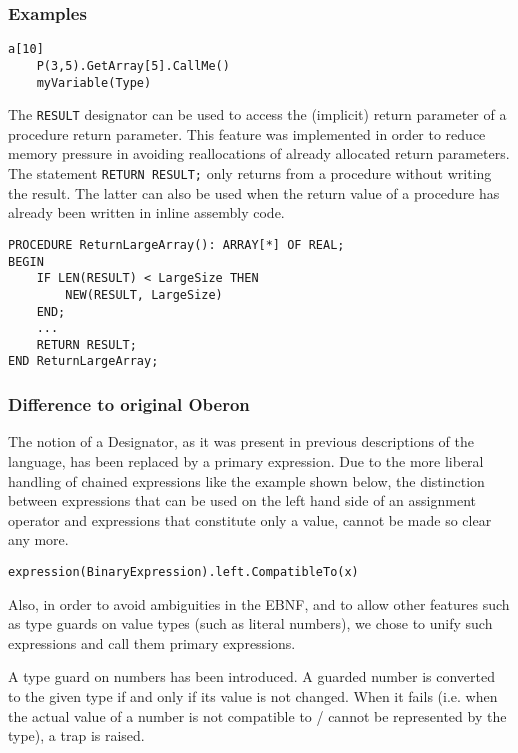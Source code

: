 \documentclass[a4wide,11pt]{article}
\begin{document}
\begin{annotation}
\subsubsection{Examples}
\begin{lstlisting}[style=example,caption=Example of Designators]
	a[10]
	P(3,5).GetArray[5].CallMe()
	myVariable(Type)
\end{lstlisting}

The \lstinline"RESULT" designator can be used to access the (implicit) return parameter of a procedure return parameter.
This feature was implemented in order to reduce memory pressure in avoiding reallocations of already allocated return parameters.
The statement \lstinline"RETURN RESULT;" only returns from a procedure without writing the result.
The latter can also be used when the return value of a procedure has already been written in inline assembly code.
\begin{lstlisting}[style=example]
PROCEDURE ReturnLargeArray(): ARRAY[*] OF REAL;
BEGIN
	IF LEN(RESULT) < LargeSize THEN
		NEW(RESULT, LargeSize)
	END;
	...
	RETURN RESULT;
END ReturnLargeArray;
\end{lstlisting}

\subsubsection{Difference to original Oberon}
The notion of a Designator, as it was present in previous descriptions of the language, has been replaced by a primary expression.
Due to the more liberal handling of chained expressions like the example shown below, the distinction between expressions that can be used on the left hand side of an assignment operator and expressions that constitute only a value, cannot be made so clear any more.
\begin{lstlisting}[style=example]
expression(BinaryExpression).left.CompatibleTo(x)
\end{lstlisting}

Also, in order to avoid ambiguities in the EBNF, and to allow other features such as type guards on value types (such as literal numbers), we chose to unify such expressions and call them primary expressions.

A type guard on numbers has been introduced. 
A guarded number is converted to the given type if and only if its value is not changed.
When it fails (i.e. when the actual value of a number is not compatible to / cannot be represented by the type), a trap is raised.


\end{annotation}
\end{document}
